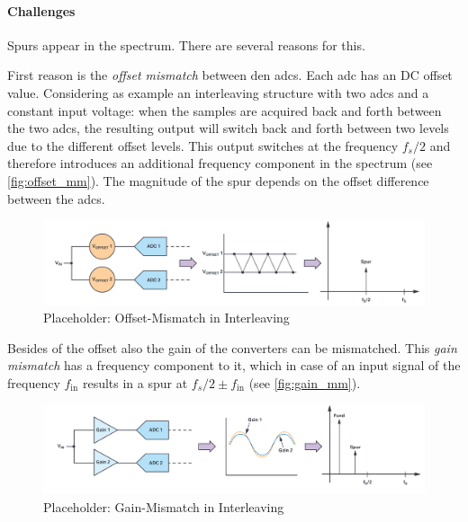\paragraph{Challenges}
Spurs appear in the spectrum. There are several reasons for this.

First reason is the \textit{offset mismatch} between den \glspl{adc}. Each \gls{adc} has an DC offset value. Considering as example an interleaving structure with two \glspl{adc} and a constant input voltage: when the samples are acquired back and forth between the two \glspl{adc}, the resulting output will switch back and forth between two levels due to the different offset levels. This output switches at the frequency $f_s/2$ and therefore introduces an additional frequency component in the spectrum (see \autoref{fig:offset_mm}). The magnitude of the spur depends on the offset difference between the \glspl{adc}. \cite{Harris2019}

\begin{figure}[tbh]
	\centering
	\includegraphics[width = \textwidth]{chap/02-theory/img/offset_mm}
	\caption{Placeholder: Offset-Mismatch in Interleaving \cite{Harris2019}}
	\label{fig:offset_mm}
\end{figure}

Besides of the offset also the gain of the converters can be mismatched. This \textit{gain mismatch} has a frequency component to it, which in case of an input signal of the frequency $f_{\text{in}}$ results in a spur at $f_s/2 \pm f_{\text{in}}$ (see \autoref{fig:gain_mm}). \cite{Harris2019}
\begin{figure}[tbh]
	\centering
	\includegraphics[width = \textwidth]{chap/02-theory/img/gain_mm}
	\caption{Placeholder: Gain-Mismatch in Interleaving \cite{Harris2019}}
	\label{fig:gain_mm}
\end{figure}

